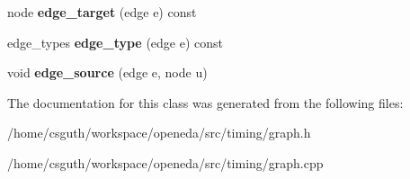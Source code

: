 \begin{DoxyCompactItemize}
\item 
\hypertarget{classophidian_1_1timing_1_1graph_a8f589ce4f52217cd65d0a5885da649de}{node {\bfseries edge\-\_\-target} (edge e) const }\label{classophidian_1_1timing_1_1graph_a8f589ce4f52217cd65d0a5885da649de}

\item 
\hypertarget{classophidian_1_1timing_1_1graph_ac3490d78fe7f9b7a0b61369f1e170f18}{edge\-\_\-types {\bfseries edge\-\_\-type} (edge e) const }\label{classophidian_1_1timing_1_1graph_ac3490d78fe7f9b7a0b61369f1e170f18}

\item 
\hypertarget{classophidian_1_1timing_1_1graph_a7104b3510c15b5e61b17e475b85ac108}{void {\bfseries edge\-\_\-source} (edge e, node u)}\label{classophidian_1_1timing_1_1graph_a7104b3510c15b5e61b17e475b85ac108}

\end{DoxyCompactItemize}


The documentation for this class was generated from the following files\-:\begin{DoxyCompactItemize}
\item 
/home/csguth/workspace/openeda/src/timing/graph.\-h\item 
/home/csguth/workspace/openeda/src/timing/graph.\-cpp\end{DoxyCompactItemize}
